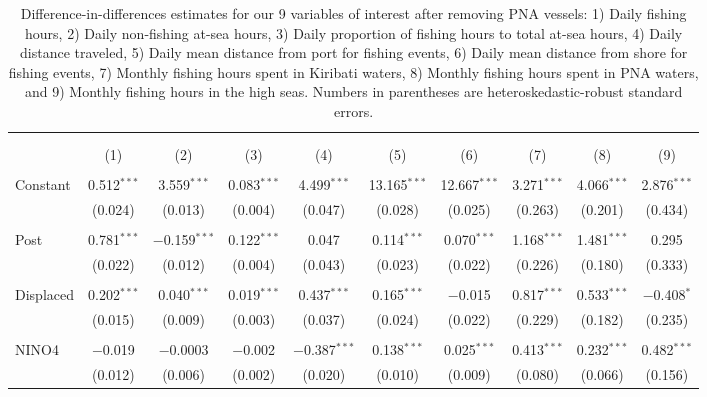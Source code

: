 
\begin{table}[H] \centering 
  \caption{\label{tab:DID_without_PNA}Difference-in-differences estimates for our 9 variables of interest after removing PNA vessels: 1) Daily fishing hours, 2) Daily non-fishing at-sea hours, 3) Daily proportion of fishing hours to total at-sea hours, 4) Daily distance traveled, 5) Daily mean distance from port for fishing events, 6) Daily mean distance from shore for fishing events, 7) Monthly fishing hours spent in Kiribati waters, 8) Monthly fishing hours spent in PNA waters, and 9) Monthly fishing hours in the high seas. Numbers in parentheses are heteroskedastic-robust standard errors.} 
  \label{} 
\footnotesize 
\begin{tabular}{@{\extracolsep{1pt}}lccccccccc} 
\\[-1.8ex]\hline 
\hline \\[-1.8ex] 
\\[-1.8ex] & (1) & (2) & (3) & (4) & (5) & (6) & (7) & (8) & (9)\\ 
\hline \\[-1.8ex] 
 Constant & 0.512$^{***}$ & 3.559$^{***}$ & 0.083$^{***}$ & 4.499$^{***}$ & 13.165$^{***}$ & 12.667$^{***}$ & 3.271$^{***}$ & 4.066$^{***}$ & 2.876$^{***}$ \\ 
  & (0.024) & (0.013) & (0.004) & (0.047) & (0.028) & (0.025) & (0.263) & (0.201) & (0.434) \\ 
  & & & & & & & & & \\ 
 Post & 0.781$^{***}$ & $-$0.159$^{***}$ & 0.122$^{***}$ & 0.047 & 0.114$^{***}$ & 0.070$^{***}$ & 1.168$^{***}$ & 1.481$^{***}$ & 0.295 \\ 
  & (0.022) & (0.012) & (0.004) & (0.043) & (0.023) & (0.022) & (0.226) & (0.180) & (0.333) \\ 
  & & & & & & & & & \\ 
 Displaced & 0.202$^{***}$ & 0.040$^{***}$ & 0.019$^{***}$ & 0.437$^{***}$ & 0.165$^{***}$ & $-$0.015 & 0.817$^{***}$ & 0.533$^{***}$ & $-$0.408$^{*}$ \\ 
  & (0.015) & (0.009) & (0.003) & (0.037) & (0.024) & (0.022) & (0.229) & (0.182) & (0.235) \\ 
  & & & & & & & & & \\ 
 NINO4 & $-$0.019 & $-$0.0003 & $-$0.002 & $-$0.387$^{***}$ & 0.138$^{***}$ & 0.025$^{***}$ & 0.413$^{***}$ & 0.232$^{***}$ & 0.482$^{***}$ \\ 
  & (0.012) & (0.006) & (0.002) & (0.020) & (0.010) & (0.009) & (0.080) & (0.066) & (0.156) \\ 

\end{tabular}
\end{table}
